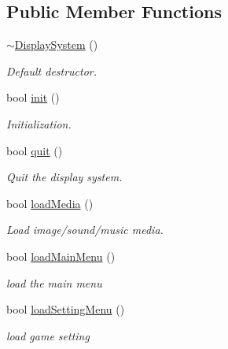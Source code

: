 \subsection*{Public Member Functions}
\begin{DoxyCompactItemize}
\item 
\mbox{\label{class_display_system_ac13cbef9272e878f0f2aa629910b067c}} 
\mbox{\hyperlink{class_display_system_ac13cbef9272e878f0f2aa629910b067c}{$\sim$\+Display\+System}} ()
\begin{DoxyCompactList}\small\item\em Default destructor. \end{DoxyCompactList}\item 
bool \mbox{\hyperlink{class_display_system_ad1da18a99d8d2dd15ecbd1f355f306f5}{init}} ()
\begin{DoxyCompactList}\small\item\em Initialization. \end{DoxyCompactList}\item 
bool \mbox{\hyperlink{class_display_system_ac39d9b8a2c9c50e60a1a84ed0e152bda}{quit}} ()
\begin{DoxyCompactList}\small\item\em Quit the display system. \end{DoxyCompactList}\item 
bool \mbox{\hyperlink{class_display_system_a648e9597c6a629a2aab5f8ba7c3d28e8}{load\+Media}} ()
\begin{DoxyCompactList}\small\item\em Load image/sound/music media. \end{DoxyCompactList}\item 
\mbox{\label{class_display_system_a65dda8464ff284d4db244260a28dec63}} 
bool \mbox{\hyperlink{class_display_system_a65dda8464ff284d4db244260a28dec63}{load\+Main\+Menu}} ()
\begin{DoxyCompactList}\small\item\em load the main menu \end{DoxyCompactList}\item 
\mbox{\label{class_display_system_a8b992f8dd3b1d91d4d4c7ba9c3996ef7}} 
bool \mbox{\hyperlink{class_display_system_a8b992f8dd3b1d91d4d4c7ba9c3996ef7}{load\+Setting\+Menu}} ()
\begin{DoxyCompactList}\small\item\em load game setting \end{DoxyCompactList}\item 

\end{DoxyCompactItemize}
